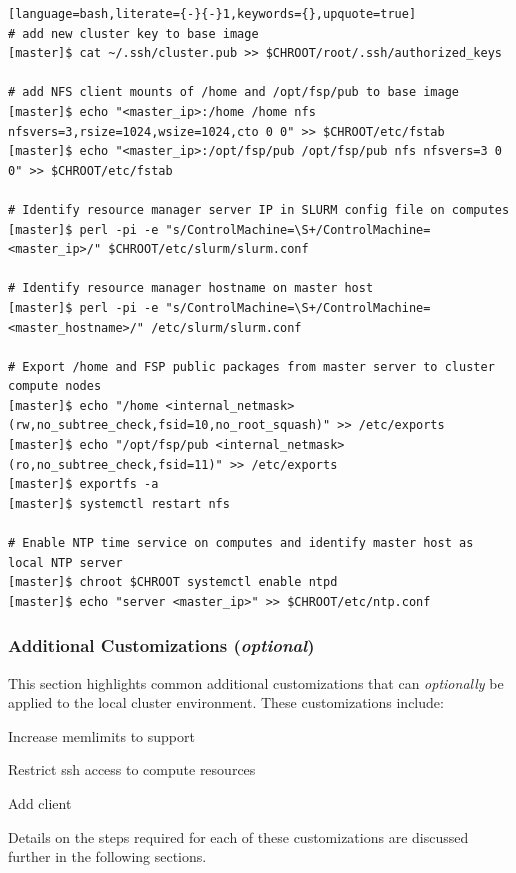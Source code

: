 \documentclass[letterpaper]{article}
\begin{document}
\begin{lstlisting}[language=bash,literate={-}{-}1,keywords={},upquote=true]
# add new cluster key to base image
[master]$ cat ~/.ssh/cluster.pub >> $CHROOT/root/.ssh/authorized_keys

# add NFS client mounts of /home and /opt/fsp/pub to base image
[master]$ echo "<master_ip>:/home /home nfs nfsvers=3,rsize=1024,wsize=1024,cto 0 0" >> $CHROOT/etc/fstab
[master]$ echo "<master_ip>:/opt/fsp/pub /opt/fsp/pub nfs nfsvers=3 0 0" >> $CHROOT/etc/fstab

# Identify resource manager server IP in SLURM config file on computes
[master]$ perl -pi -e "s/ControlMachine=\S+/ControlMachine=<master_ip>/" $CHROOT/etc/slurm/slurm.conf

# Identify resource manager hostname on master host
[master]$ perl -pi -e "s/ControlMachine=\S+/ControlMachine=<master_hostname>/" /etc/slurm/slurm.conf

# Export /home and FSP public packages from master server to cluster compute nodes
[master]$ echo "/home <internal_netmask>(rw,no_subtree_check,fsid=10,no_root_squash)" >> /etc/exports
[master]$ echo "/opt/fsp/pub <internal_netmask>(ro,no_subtree_check,fsid=11)" >> /etc/exports
[master]$ exportfs -a
[master]$ systemctl restart nfs

# Enable NTP time service on computes and identify master host as local NTP server
[master]$ chroot $CHROOT systemctl enable ntpd
[master]$ echo "server <master_ip>" >> $CHROOT/etc/ntp.conf
\end{lstlisting}

\subsubsection{Additional Customizations ({\em optional})}

This section highlights common additional customizations that
can {\em optionally} be applied to the
local cluster environment. These customizations include:

\begin{itemize*}
\item Increase memlimits to support \InfiniBand{}
\item Restrict ssh access to compute resources
\item Add \Lustre{} client
\end{itemize*}

\noindent Details on the steps required for each of these customizations are
discussed further in the following sections.
\end{document}
